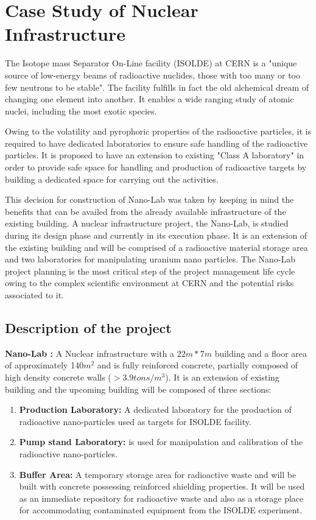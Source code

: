 \let\textcircled=\pgftextcircled
\chapter{Case Study of Nuclear Infrastructure}
\label{chap:chap5}
The Isotope mass Separator On-Line facility (ISOLDE)\cite{isolde} at CERN is a "unique source of low-energy beams of radioactive nuclides, those with too many or too few neutrons to be stable". The facility fulfills in fact the old alchemical dream of changing one element into another. It enables  a wide ranging study of atomic nuclei, including the most exotic species. 

Owing to the volatility and pyrophoric properties of the radioactive particles, it is required to have dedicated laboratories to ensure safe handling of the radioactive particles. It is proposed to have an extension to existing "Class A laboratory"\cite{iaea} in order to provide safe space for handling and production of radioactive targets by building a dedicated space for carrying out the activities.

This decision for construction of Nano-Lab was taken by keeping in mind the benefits that can be availed from the already available infrastructure of the existing building.  A nuclear infrastructure project, the Nano-Lab, is studied during its design phase and currently in its execution phase. It is an extension of the existing building and will be comprised of a radioactive material storage area and two laboratories for manipulating uranium nano particles. The Nano-Lab project planning is the most critical step of the project management life cycle owing to the complex scientific environment at CERN and the potential risks associated to it. 

\section{Description of the project}

\textbf{Nano-Lab :}  A Nuclear infrastructure with a $22m * 7m$ building and a floor area of approximately 140$m^{2}$ and is fully reinforced concrete, partially composed of high density concrete walls ($> 3.9 tons/m^{3}$). It is an extension of existing building and the upcoming building will be composed of three sections:

\begin{enumerate}
	\item \textbf{Production Laboratory:} A dedicated laboratory for the production of radioactive nano-particles used as targets for ISOLDE facility.
	
	\item \textbf{Pump stand Laboratory:} is used for manipulation and calibration of the radioactive nano-particles.
	
	\item \textbf{Buffer Area:} A temporary storage area for radioactive waste and will be built with concrete possessing reinforced shielding properties. It will be used as an immediate repository for radioactive waste and also as a storage place for accommodating contaminated equipment from the ISOLDE experiment.
\end{enumerate}

